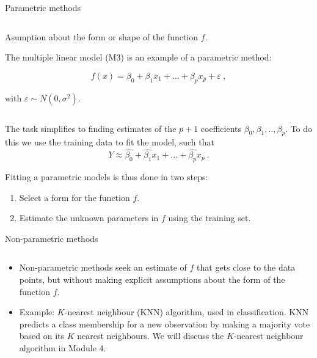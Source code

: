 \documentclass[ignorenonframetext,]{beamer}
\providecommand{\tightlist}{%
  \setlength{\itemsep}{0pt}\setlength{\parskip}{0pt}}
\begin{document}
\begin{frame}

\begin{block}{Parametric methods}

\(~\)

Asumption about the form or shape of the function \(f\).

The multiple linear model (M3) is an example of a parametric method:

\[f(x) = \beta_0 + \beta_1 x_1 + ... + \beta_p x_p+\varepsilon \ , \]

with \(\varepsilon \sim N(0,\sigma^2)\).

\(~\)

The task simplifies to finding estimates of the \(p+1\) coefficients
\(\beta_0, \beta_1, .. ,\beta_p\). To do this we use the training data
to fit the model, such that
\[Y \approx \hat{\beta_0} + \hat{\beta_1} x_1 + ... + \hat{\beta_p} x_p \ .\]

\end{block}

\end{frame}

\begin{frame}

Fitting a parametric models is thus done in two steps:

\begin{enumerate}
\tightlist
\item
  Select a form for the function \(f\).\\
\item
  Estimate the unknown parameters in \(f\) using the training set.
\end{enumerate}

\end{frame}

\begin{frame}

\begin{block}{Non-parametric methods}

\(~\)

\begin{itemize}
\tightlist
\item
  Non-parametric methods seek an estimate of \(f\) that gets close to
  the data points, but without making explicit assumptions about the
  form of the function \(f\).
\end{itemize}

\vspace{2mm}

\begin{itemize}
\tightlist
\item
  Example: \(K\)-nearest neighbour (KNN) algorithm, used in
  classification. KNN predicts a class membership for a new observation
  by making a majority vote based on its \(K\) nearest neighbours. We
  will discuss the \(K\)-nearest neighbour algorithm in Module 4.
\end{itemize}

\end{block}

\end{frame}
\end{document}
